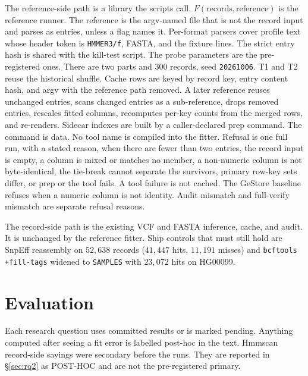 \documentclass[letterpaper,twocolumn,10pt]{article}
\begin{document}
The reference-side path is a library the scripts call.
$F(\mathrm{records},\mathrm{reference})$ is the reference runner.
The reference is the argv-named file that is not the record input and parses as entries, unless a flag names it.
Per-format parsers cover profile text whose header token is \texttt{HMMER3/f}, FASTA, and the fixture lines.
The strict entry hash is shared with the kill-test script.
The probe parameters are the pre-registered ones.
There are two parts and 300 records, seed \texttt{20261006}. %
T1 and T2 reuse the historical shuffle.
Cache rows are keyed by record key, entry content hash, and argv with the reference path removed.
A later reference reuses unchanged entries, scans changed entries as a sub-reference, drops removed entries, rescales fitted columns, recomputes per-key counts from the merged rows, and re-renders.
Sidecar indexes are built by a caller-declared prep command.
The command is data.
No tool name is compiled into the fitter.
Refusal is one full run, with a stated reason, when there are fewer than two entries, the record input is empty, a column is mixed or matches no member, a non-numeric column is not byte-identical, the tie-break cannot separate the survivors, primary row-key sets differ, or prep or the tool fails.
A tool failure is not cached.
The GeStore baseline refuses when a numeric column is not identity.
Audit mismatch and full-verify mismatch are separate refusal reasons.

The record-side path is the existing VCF and FASTA inference, cache, and audit.
It is unchanged by the reference fitter.
Ship controls that must still hold are SnpEff reassembly on
$52{,}638$
records
($41{,}447$ hits,
$11{,}191$ misses)
and \texttt{bcftools +fill-tags} widened to \texttt{SAMPLES} with
$23{,}072$
hits on HG00099.

\section{Evaluation}
\label{sec:eval}

Each research question uses committed results or is marked pending.
Anything computed after seeing a fit error is labelled post-hoc in the text.
Hmmscan record-side savings were secondary before the runs.
They are reported in \S\ref{sec:rq2} as POST-HOC and are not the pre-registered primary.
\end{document}
